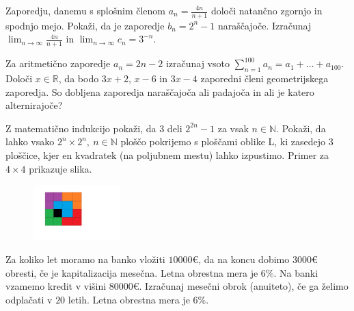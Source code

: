 \documentclass{izpit}
\begin{document}
\naloga[\tocke{9}]
  \podnaloga[4]
  Zaporedju, danemu s splošnim členom $a_n=\frac{4n}{n+1}$ določi natančno zgornjo in spodnjo mejo.
  \prostor[1]
  \podnaloga[3]
  Pokaži, da je zaporedje $b_n=2^n-1$ naraščajoče.
  \prostor[1]
  \podnaloga[2]
  Izračunaj $\lim_{n \rightarrow \infty}\frac{4n}{n+1}$ in $\lim_{n\rightarrow\infty}c_n=3^{-n}$.
  \prostor[1]
  
\naloga[\tocke{8}]
  \podnaloga[3]
  Za aritmetično zaporedje $a_n=2n-2$ izračunaj vsoto $\sum_{n=1}^{100} a_n =a_1 +\ldots +a_{100}$.
  \prostor[1]
  \podnaloga[5]
  Določi $x\in\mathbb{R}$, da bodo $3x+2$, $x-6$ in $3x-4$ zaporedni členi geometrijskega zaporedja. So dobljena zaporedja naraščajoča ali padajoča in ali je katero alternirajoče?
  \prostor[1]


\naloga[\tocke{5}]
  \podnaloga[5]
  Z matematično indukcijo pokaži, da $3$ deli $2^{2n}-1$ za vsak $n\in \mathbb{N}$.
  \prostor[2]
  Pokaži, da lahko vsako $2^n\times 2^n,\ n\in\mathbb{N}$ ploščo pokrijemo s ploščami oblike L, ki zasedejo 3 ploščice, kjer en kvadratek (na poljubnem mestu) lahko izpustimo. Primer za $4\times 4$ prikazuje slika.
  \begin{figure}[H]
  \centering
  \includegraphics[width =0.3\textwidth]{naloga.jpg}
  \end{figure}
  \prostor[1]


\naloga[\tocke{8}]
  \podnaloga[4]
  Za koliko let moramo na banko vložiti $10000\euro{}$, da na koncu dobimo $3000\euro{}$ obresti, če je kapitalizacija mesečna. Letna obrestna mera je $6\%$.
  \prostor[1]
  \podnaloga[4]
  Na banki vzamemo kredit v višini $80000\euro{}$. Izračunaj mesečni obrok (anuiteto), če ga želimo odplačati v $20$ letih. Letna obrestna mera je $6\%$.
  \prostor[1]
\end{document}
